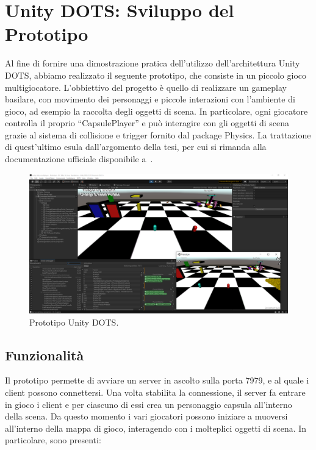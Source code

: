 \chapter{Unity DOTS: Sviluppo del Prototipo}
\label{cap:prototipo}

Al fine di fornire una dimostrazione pratica dell'utilizzo dell'architettura Unity DOTS, abbiamo realizzato il seguente prototipo, che consiste in un piccolo gioco multigiocatore. L'obbiettivo del progetto è quello di realizzare un gameplay basilare, con movimento dei personaggi e piccole interazioni con l'ambiente di gioco, ad esempio la raccolta degli oggetti di scena. In particolare, ogni giocatore controlla il proprio ``CapsulePlayer'' e può interagire con gli oggetti di scena grazie al sistema di collisione e trigger fornito dal package Physics. La trattazione di quest'ultimo esula dall'argomento della tesi, per cui si rimanda alla documentazione ufficiale disponibile a~\cite{doc:unity-physics-manual}.

\begin{figure}[!ht]
    \centering
    \includegraphics[width=0.95\columnwidth]{gfx/imgs/chapter4/ShowcasePrototipo.png}
    \caption{Prototipo Unity DOTS.}
    \label{fig:prototipo-dots}
\end{figure}

\section{Funzionalità}
Il prototipo permette di avviare un server in ascolto sulla porta 7979, e al quale i client possono connettersi. Una volta stabilita la connessione, il server fa entrare in gioco i client e per ciascuno di essi crea un personaggio capsula all'interno della scena. Da questo momento i vari giocatori possono iniziare a muoversi all'interno della mappa di gioco, interagendo con i molteplici oggetti di scena. In particolare, sono presenti:

